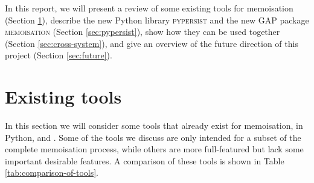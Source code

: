 \documentclass{deliverablereport}
\newcommand{\pypersist}{\textsc{pypersist}}
\newcommand{\Memoisation}{\textsc{memoisation}}
\begin{document}
In this report, we will present a review of some existing tools for memoisation
(Section \ref{sec:existing}), describe the new Python library \pypersist{} and
the new GAP package \Memoisation{} (Section \ref{sec:pypersist}), show how they
can be used together (Section \ref{sec:cross-system}), and give an overview of
the future direction of this project (Section \ref{sec:future}).

\section{Existing tools}
\label{sec:existing}

In this section we will consider some tools that already exist for memoisation,
in Python, \Sage and \GAP.  Some of the tools we discuss are only
intended for a subset of the complete memoisation process, while others are more
full-featured but lack some important desirable features.  A comparison of these
tools is shown in Table \ref{tab:comparison-of-tools}.
\end{document}
